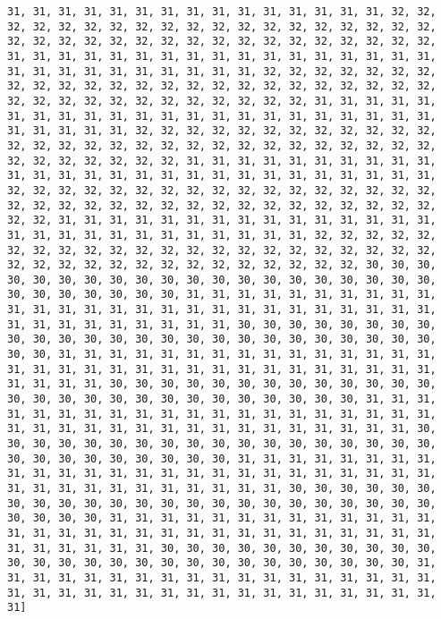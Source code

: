 \documentclass[
]{book}
\begin{document}
\begin{verbatim}
31, 31, 31, 31, 31, 31, 31, 31, 31, 31, 31, 31, 31, 31, 31, 32, 32, 32, 32, 32, 32, 32, 32, 32, 32, 32, 32, 32, 32, 32, 32, 32, 32, 32, 32, 32, 32, 32, 32, 32, 32, 32, 32, 32, 32, 32, 32, 32, 32, 32, 32, 31, 31, 31, 31, 31, 31, 31, 31, 31, 31, 31, 31, 31, 31, 31, 31, 31, 31, 31, 31, 31, 31, 31, 31, 31, 31, 31, 32, 32, 32, 32, 32, 32, 32, 32, 32, 32, 32, 32, 32, 32, 32, 32, 32, 32, 32, 32, 32, 32, 32, 32, 32, 32, 32, 32, 32, 32, 32, 32, 32, 32, 32, 32, 31, 31, 31, 31, 31, 31, 31, 31, 31, 31, 31, 31, 31, 31, 31, 31, 31, 31, 31, 31, 31, 31, 31, 31, 31, 31, 31, 32, 32, 32, 32, 32, 32, 32, 32, 32, 32, 32, 32, 32, 32, 32, 32, 32, 32, 32, 32, 32, 32, 32, 32, 32, 32, 32, 32, 32, 32, 32, 32, 32, 32, 32, 32, 31, 31, 31, 31, 31, 31, 31, 31, 31, 31, 31, 31, 31, 31, 31, 31, 31, 31, 31, 31, 31, 31, 31, 31, 31, 31, 31, 32, 32, 32, 32, 32, 32, 32, 32, 32, 32, 32, 32, 32, 32, 32, 32, 32, 32, 32, 32, 32, 32, 32, 32, 32, 32, 32, 32, 32, 32, 32, 32, 32, 32, 32, 32, 31, 31, 31, 31, 31, 31, 31, 31, 31, 31, 31, 31, 31, 31, 31, 31, 31, 31, 31, 31, 31, 31, 31, 31, 31, 31, 31, 32, 32, 32, 32, 32, 32, 32, 32, 32, 32, 32, 32, 32, 32, 32, 32, 32, 32, 32, 32, 32, 32, 32, 32, 32, 32, 32, 32, 32, 32, 32, 32, 32, 32, 32, 32, 30, 30, 30, 30, 30, 30, 30, 30, 30, 30, 30, 30, 30, 30, 30, 30, 30, 30, 30, 30, 30, 30, 30, 30, 30, 30, 30, 31, 31, 31, 31, 31, 31, 31, 31, 31, 31, 31, 31, 31, 31, 31, 31, 31, 31, 31, 31, 31, 31, 31, 31, 31, 31, 31, 31, 31, 31, 31, 31, 31, 31, 31, 31, 30, 30, 30, 30, 30, 30, 30, 30, 30, 30, 30, 30, 30, 30, 30, 30, 30, 30, 30, 30, 30, 30, 30, 30, 30, 30, 30, 31, 31, 31, 31, 31, 31, 31, 31, 31, 31, 31, 31, 31, 31, 31, 31, 31, 31, 31, 31, 31, 31, 31, 31, 31, 31, 31, 31, 31, 31, 31, 31, 31, 31, 31, 31, 30, 30, 30, 30, 30, 30, 30, 30, 30, 30, 30, 30, 30, 30, 30, 30, 30, 30, 30, 30, 30, 30, 30, 30, 30, 30, 30, 31, 31, 31, 31, 31, 31, 31, 31, 31, 31, 31, 31, 31, 31, 31, 31, 31, 31, 31, 31, 31, 31, 31, 31, 31, 31, 31, 31, 31, 31, 31, 31, 31, 31, 31, 31, 30, 30, 30, 30, 30, 30, 30, 30, 30, 30, 30, 30, 30, 30, 30, 30, 30, 30, 30, 30, 30, 30, 30, 30, 30, 30, 30, 31, 31, 31, 31, 31, 31, 31, 31, 31, 31, 31, 31, 31, 31, 31, 31, 31, 31, 31, 31, 31, 31, 31, 31, 31, 31, 31, 31, 31, 31, 31, 31, 31, 31, 31, 31, 30, 30, 30, 30, 30, 30, 30, 30, 30, 30, 30, 30, 30, 30, 30, 30, 30, 30, 30, 30, 30, 30, 30, 30, 30, 30, 30, 31, 31, 31, 31, 31, 31, 31, 31, 31, 31, 31, 31, 31, 31, 31, 31, 31, 31, 31, 31, 31, 31, 31, 31, 31, 31, 31, 31, 31, 31, 31, 31, 31, 31, 31, 31, 30, 30, 30, 30, 30, 30, 30, 30, 30, 30, 30, 30, 30, 30, 30, 30, 30, 30, 30, 30, 30, 30, 30, 30, 30, 30, 30, 31, 31, 31, 31, 31, 31, 31, 31, 31, 31, 31, 31, 31, 31, 31, 31, 31, 31, 31, 31, 31, 31, 31, 31, 31, 31, 31, 31, 31, 31, 31, 31, 31, 31, 31, 31]
\end{verbatim}
\end{document}
